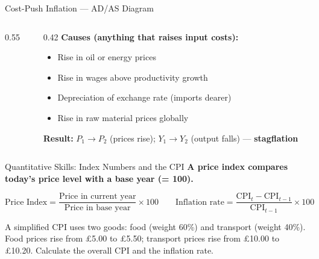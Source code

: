 \documentclass[16pt,aspectratio=169]{beamer}
\begin{document}
\begin{frame}{Cost-Push Inflation --- AD/AS Diagram}
\begin{columns}
\begin{column}{0.55\textwidth}
\begin{center}
            \end{center}
        \end{column}
        \begin{column}{0.42\textwidth}
            \textbf{Causes (anything that raises input costs):}
            \begin{itemize}\setlength\itemsep{0.2em}
                \item \small Rise in oil or energy prices
                \item \small Rise in wages above productivity growth
                \item \small Depreciation of exchange rate (imports dearer)
                \item \small Rise in raw material prices globally
            \end{itemize}
            \vspace{0.3em}
            \textbf{Result:} $P_1 \to P_2$ (prices rise); $Y_1 \to Y_2$ (output falls) --- \textbf{stagflation}
        \end{column}
    \end{columns}
\end{frame}

\begin{frame}{Quantitative Skills: Index Numbers and the CPI}
    \textbf{A price index compares today's price level with a base year (= 100).}

    \vspace{0.3em}
    \[
        \text{Price Index} = \frac{\text{Price in current year}}{\text{Price in base year}} \times 100
        \qquad
        \text{Inflation rate} = \frac{\text{CPI}_t - \text{CPI}_{t-1}}{\text{CPI}_{t-1}} \times 100
    \]

    \vspace{0.5em}
    \begin{examplequestion}
        A simplified CPI uses two goods: food (weight 60\%) and transport (weight 40\%). Food prices rise from £5.00 to £5.50; transport prices rise from £10.00 to £10.20. Calculate the overall CPI and the inflation rate.
    \end{examplequestion}
\end{frame}
\end{document}
